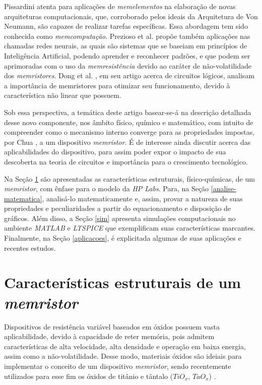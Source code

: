 \documentclass{ceel}
\begin{document}
\begin{multicols}{2}
Pissardini \cite{memcomputacao} atenta para aplicações de \emph{memelementos} na elaboração de novas arquiteturas computacionais, que, corroborado pelos ideais da Arquitetura de Von Neumann, são capazes de realizar tarefas específicas. Essa abordagem tem sido conhecida como \emph{memcomputação}. Prezioso et al. \cite{rneurais} propõe também aplicações nas chamadas redes neurais, as quais são sistemas que se baseiam em princípios de Inteligência Artificial, podendo aprender e reconhecer padrões, e que podem ser aprimoradas com o uso da \emph{memresistência} devido ao caráter de não-volatilidade dos \emph{memristores}. Dong et al. \cite{chines}, em seu artigo acerca de circuitos lógicos, analisam a importância de memristores para otimizar seu funcionamento, devido à característica não linear que possuem.

Sob essa perspectiva, a temática deste artigo basear-se-á na descrição detalhada desse novo componente, nos âmbito físico, químico e matemático, com intuito de compreender como o mecanismo interno converge para as propriedades impostas,  por Chua \cite{artigo}, a um dispositivo \emph{memristor}. É de interesse ainda discutir acerca das aplicabilidades do dispositivo, para assim poder expor o impacto de sua descoberta na teoria de circuitos e importância para o crescimento tecnológico. %

Na Seção \ref{estrutura} são apresentadas as características estruturais, físico-químicas, de um \emph{memristor}, com ênfase para o modelo da \emph{HP Labs}. Para, na Seção \ref{analise-matematica}, analisá-lo matematicamente e, assim, provar a natureza de suas propriedades e peculiaridades a partir do equacionamento e disposição de gráficos. Além disso, a Seção \ref{sim} apresenta simulações computacionais no ambiente \emph{MATLAB}
 e \emph{LTSPICE} que exemplificam suas características marcantes. Finalmente, na Seção \ref{aplicacoes}, é explicitada algumas de suas aplicações e recentes estudos.

\section{Características estruturais de um \emph{memristor}} \label{estrutura}
Dispositivos de resistência variável baseados em óxidos 
possuem vasta aplicabilidade, devido à capacidade de reter memória, pois
admitem características de alta velocidade, alta densidade e operação em baixa energia, 
assim como a não-volatilidade. Desse modo, materiais óxidos são ideiais para implementar o conceito de um dispositivo \emph{memristor}, sendo recentemente utilizados para esse fim os óxidos de titânio e tântalo ($TiO_x$, $TaO_x$) \cite{conceito}. %


\end{multicols}
\end{document}
